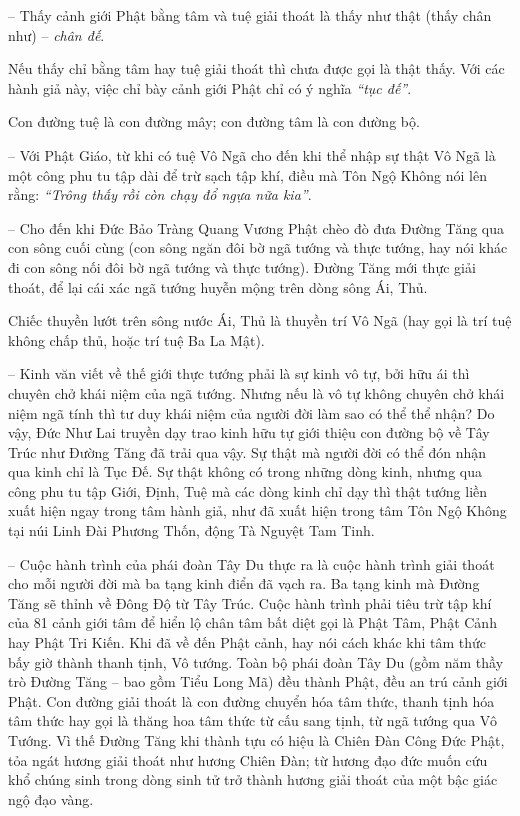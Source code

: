 -- Thấy cảnh giới Phật bằng tâm và tuệ giải thoát là thấy như thật (thấy chân như) -- \emph{chân đế}.

Nếu thấy chỉ bằng tâm hay tuệ giải thoát thì chưa được gọi là thật thấy. Với các hành giả này, việc chỉ bày cảnh giới Phật chỉ có ý nghĩa \emph{``tục đế''}.

Con đường tuệ là con đường mây; con đường tâm là con đường bộ.

-- Với Phật Giáo, từ khi có tuệ Vô Ngã cho đến khi thể nhập sự thật Vô Ngã là một công phu tu tập dài để trừ sạch tập khí, điều mà Tôn Ngộ Không nói lên rằng: \emph{``Trông thấy rồi còn chạy đổ ngựa nữa kia''}.

-- Cho đến khi Đức Bảo Tràng Quang Vương Phật chèo đò đưa Đường Tăng qua con sông cuối cùng (con sông ngăn đôi bờ ngã tướng và thực tướng, hay nói khác đi con sông nối đôi bờ ngã tướng và thực tướng). Đường Tăng mới thực giải thoát, để lại cái xác ngã tướng huyễn mộng trên dòng sông Ái, Thủ.

Chiếc thuyền lướt trên sông nước Ái, Thủ là thuyền trí Vô Ngã (hay gọi là trí tuệ không chấp thủ, hoặc trí tuệ Ba La Mật).

-- Kinh văn viết về thế giới thực tướng phải là sự kinh vô tự, bởi hữu ái thì chuyên chở khái niệm của ngã tướng. Nhưng nếu là vô tự không chuyên chở khái niệm ngã tính thì tư duy khái niệm của người đời làm sao có thể thể nhận? Do vậy, Đức Như Lai truyền dạy trao kinh hữu tự giới thiệu con đường bộ về Tây Trúc như Đường Tăng đã trải qua vậy. Sự thật mà người đời có thể đón nhận qua kinh chỉ là Tục Đế. Sự thật không có trong những dòng kinh, nhưng qua công phu tu tập Giới, Định, Tuệ mà các dòng kinh chỉ dạy thì thật tướng liền xuất hiện ngay trong tâm hành giả, như đã xuất hiện trong tâm Tôn Ngộ Không tại núi Linh Đài Phương Thốn, động Tà Nguyệt Tam Tinh.

-- Cuộc hành trình của phái đoàn Tây Du thực ra là cuộc hành trình giải thoát cho mỗi người đời mà ba tạng kinh điển đã vạch ra. Ba tạng kinh mà Đường Tăng sẽ thỉnh về Đông Độ từ Tây Trúc. Cuộc hành trình phải tiêu trừ tập khí của 81 cảnh giới tâm để hiển lộ chân tâm bất diệt gọi là Phật Tâm, Phật Cảnh hay Phật Tri Kiến. Khi đã về đến Phật cảnh, hay nói cách khác khi tâm thức bấy giờ thành thanh tịnh, Vô tướng. Toàn bộ phái đoàn Tây Du (gồm năm thầy trò Đường Tăng -- bao gồm Tiểu Long Mã) đều thành Phật, đều an trú cảnh giới Phật. Con đường giải thoát là con đường chuyển hóa tâm thức, thanh tịnh hóa tâm thức hay gọi là thăng hoa tâm thức từ cấu sang tịnh, từ ngã tướng qua Vô Tướng. Vì thế Đường Tăng khi thành tựu có hiệu là Chiên Đàn Công Đức Phật, tỏa ngát hương giải thoát như hương Chiên Đàn; từ hương đạo đức muốn cứu khổ chúng sinh trong dòng sinh tử trở thành hương giải thoát của một bậc giác ngộ đạo vàng.


